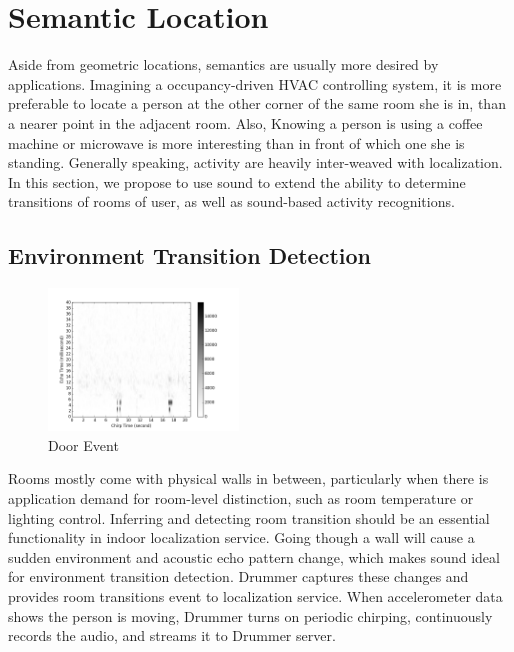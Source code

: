 \section{Semantic Location}
\label{sec:sem}

Aside from geometric locations, semantics are usually more desired by applications.
Imagining a occupancy-driven HVAC controlling system, it is more preferable to locate a person 
at the other corner of the same room she is in, than a nearer point in the adjacent room. Also,
Knowing a person is using a coffee machine or microwave is more interesting than in front of which 
one she is standing. Generally speaking, activity are heavily inter-weaved with localization.
In this section, we propose to use sound to extend the ability to determine transitions of rooms 
of user, as well as sound-based activity recognitions.


\subsection{Environment Transition Detection}
\begin{figure}[H]
\centering
\includegraphics[width=0.45\textwidth]{./fig/transition.png}
\caption{Door Event}
\label{fig:tx}
\end{figure}


Rooms mostly come with physical walls in between, particularly when there is application demand for 
room-level distinction, such as room temperature or lighting control. Inferring and 
detecting room transition should be an essential functionality in indoor localization service.
Going though a wall will cause a sudden environment 
and acoustic echo pattern change, which makes sound ideal for environment transition detection. 
Drummer captures these changes and provides room transitions event to 
localization service. When accelerometer data shows the person is moving, Drummer turns on periodic 
chirping, continuously records the audio, and streams it to Drummer server. 



